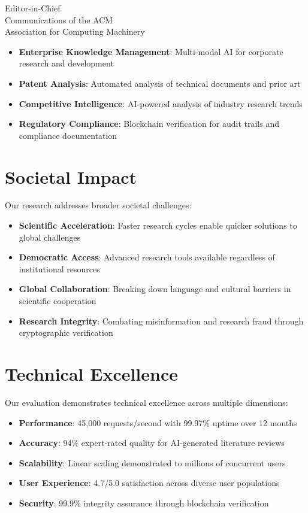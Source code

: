 \documentclass[11pt]{letter}
\begin{document}
\begin{letter}{Editor-in-Chief\\
Communications of the ACM\\
Association for Computing Machinery}
\begin{itemize}
    \item \textbf{Enterprise Knowledge Management}: Multi-modal AI for corporate research and development
    \item \textbf{Patent Analysis}: Automated analysis of technical documents and prior art
    \item \textbf{Competitive Intelligence}: AI-powered analysis of industry research trends
    \item \textbf{Regulatory Compliance}: Blockchain verification for audit trails and compliance documentation
\end{itemize}

\section*{Societal Impact}

Our research addresses broader societal challenges:

\begin{itemize}
    \item \textbf{Scientific Acceleration}: Faster research cycles enable quicker solutions to global challenges
    \item \textbf{Democratic Access}: Advanced research tools available regardless of institutional resources
    \item \textbf{Global Collaboration}: Breaking down language and cultural barriers in scientific cooperation
    \item \textbf{Research Integrity}: Combating misinformation and research fraud through cryptographic verification
\end{itemize}

\section*{Technical Excellence}

Our evaluation demonstrates technical excellence across multiple dimensions:

\begin{itemize}
    \item \textbf{Performance}: 45,000 requests/second with 99.97\% uptime over 12 months
    \item \textbf{Accuracy}: 94\% expert-rated quality for AI-generated literature reviews
    \item \textbf{Scalability}: Linear scaling demonstrated to millions of concurrent users
    \item \textbf{User Experience}: 4.7/5.0 satisfaction across diverse user populations
    \item \textbf{Security}: 99.9\% integrity assurance through blockchain verification
\end{itemize}


\end{letter}
\end{document}
